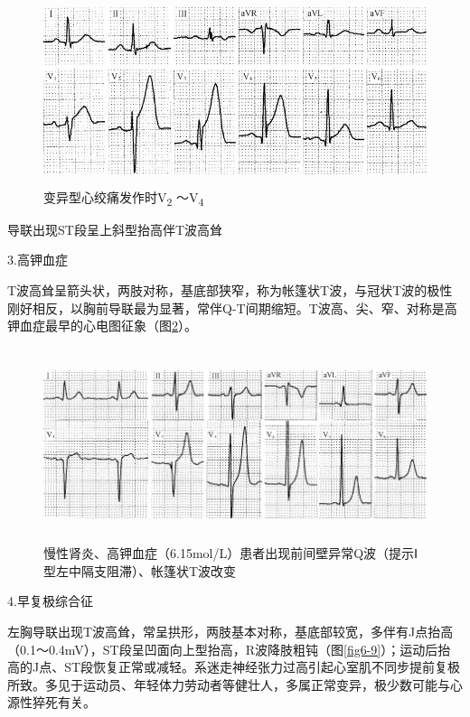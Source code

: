 \begin{figure}[!htbp]
 \centering
 \includegraphics[width=4.94792in,height=2.15625in]{./images/Image00099.jpg}
 \captionsetup{justification=centering}
 \caption{变异型心绞痛发作时V\textsubscript{2} ～V\textsubscript{4}}
 \label{fig6-7}
  \end{figure} 
导联出现ST段呈上斜型抬高伴T波高耸

3.高钾血症

T波高耸呈箭头状，两肢对称，基底部狭窄，称为帐篷状T波，与冠状T波的极性刚好相反，以胸前导联最为显著，常伴Q-T间期缩短。T波高、尖、窄、对称是高钾血症最早的心电图征象（图\ref{fig6-8}）。

\begin{figure}[!htbp]
 \centering
 \includegraphics[width=5.78125in,height=2.22917in]{./images/Image00100.jpg}
 \captionsetup{justification=centering}
 \caption{慢性肾炎、高钾血症（6.15mol/L）患者出现前间壁异常Q波（提示Ⅰ型左中隔支阻滞）、帐篷状T波改变}
 \label{fig6-8}
  \end{figure} 

4.早复极综合征

左胸导联出现T波高耸，常呈拱形，两肢基本对称，基底部较宽，多伴有J点抬高（0.1～0.4mV），ST段呈凹面向上型抬高，R波降肢粗钝（图\ref{fig6-9}）；运动后抬高的J点、ST段恢复正常或减轻。系迷走神经张力过高引起心室肌不同步提前复极所致。多见于运动员、年轻体力劳动者等健壮人，多属正常变异，极少数可能与心源性猝死有关。

